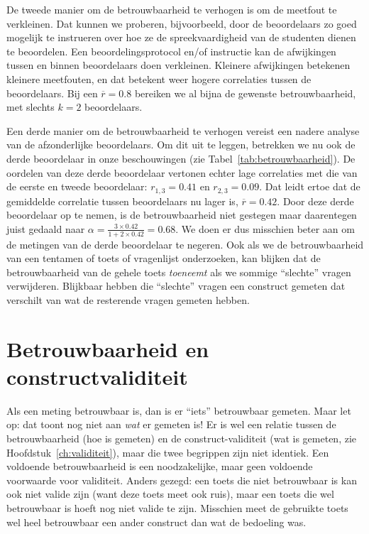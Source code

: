 \documentclass[
]{book}
\begin{document}
De tweede manier om de betrouwbaarheid te verhogen is om de meetfout te
verkleinen. Dat kunnen we proberen, bijvoorbeeld, door de beoordelaars
zo goed mogelijk te instrueren over hoe ze de spreekvaardigheid van de
studenten dienen te beoordelen. Een beoordelingsprotocol en/of
instructie kan de afwijkingen tussen en binnen beoordelaars doen
verkleinen. Kleinere afwijkingen betekenen kleinere meetfouten, en dat
betekent weer hogere correlaties tussen de beoordelaars. Bij een
\(\overline{r}=0.8\) bereiken we al bijna de gewenste betrouwbaarheid, met
slechts \(k=2\) beoordelaars.

Een derde manier om de betrouwbaarheid te verhogen vereist een nadere
analyse van de afzonderlijke beoordelaars. Om dit uit te leggen,
betrekken we nu ook de derde beoordelaar in onze beschouwingen (zie
Tabel~\ref{tab:betrouwbaarheid}). De oordelen van deze derde
beoordelaar vertonen echter lage correlaties met die van de eerste en
tweede beoordelaar: \(r_{1,3}=0.41\) en \(r_{2,3}=0.09\). Dat leidt ertoe
dat de gemiddelde correlatie tussen beoordelaars nu lager is,
\(\overline{r}=0.42\). Door deze derde beoordelaar op te nemen, is de
betrouwbaarheid niet gestegen maar daarentegen juist gedaald naar
\(\alpha = \frac{3\times0.42}{1+2\times0.42} = 0.68\). We doen er dus
misschien beter aan om de metingen van de derde beoordelaar te negeren.
Ook als we de betrouwbaarheid van een tentamen of toets of vragenlijst
onderzoeken, kan blijken dat de betrouwbaarheid van de gehele toets
\emph{toeneemt} als we sommige ``slechte'' vragen verwijderen. Blijkbaar hebben
die ``slechte'' vragen een construct gemeten dat verschilt van wat de
resterende vragen gemeten hebben.

\hypertarget{betrouwbaarheid-en-constructvaliditeit}{%
\section{Betrouwbaarheid en constructvaliditeit}\label{betrouwbaarheid-en-constructvaliditeit}}

Als een meting betrouwbaar is, dan is er ``iets'' betrouwbaar gemeten.
Maar let op: dat toont nog niet aan \emph{wat} er gemeten is! Er is wel een
relatie tussen de betrouwbaarheid (hoe is gemeten) en de
construct-validiteit (wat is gemeten, zie
Hoofdstuk~\ref{ch:validiteit}), maar die twee begrippen zijn niet identiek.
Een voldoende betrouwbaarheid is een noodzakelijke, maar geen voldoende
voorwaarde voor validiteit. Anders gezegd: een toets die niet
betrouwbaar is kan ook niet valide zijn (want deze toets meet ook ruis),
maar een toets die wel betrouwbaar is hoeft nog niet valide te zijn.
Misschien meet de gebruikte toets wel heel betrouwbaar een ander
construct dan wat de bedoeling was.
\end{document}
